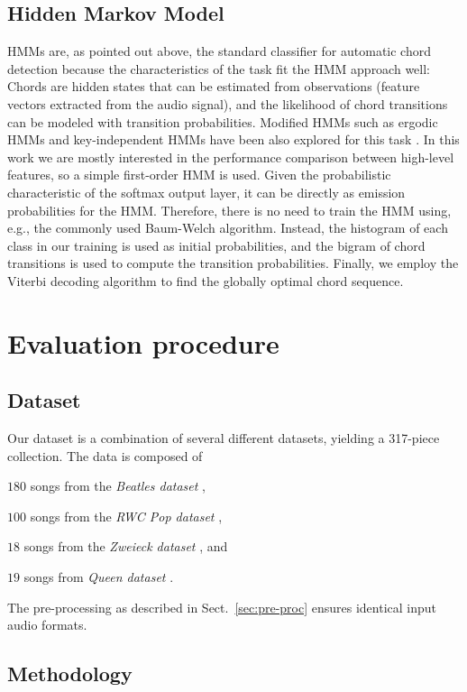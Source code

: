\documentclass{article}
\begin{document}
\subsection{Hidden Markov Model}
HMMs are, as pointed out above, the standard classifier for automatic chord detection because the characteristics of the task fit the HMM approach well: Chords are hidden states that can be estimated from observations (feature vectors extracted from the audio signal), and the likelihood of chord transitions can be modeled with transition probabilities. 
Modified HMMs such as ergodic HMMs and key-independent HMMs have been also explored for this task \cite{papadopoulos2007large,lee2008acoustic}. In this work we are mostly interested in the performance comparison between high-level features, so a simple first-order HMM is used. 
Given the probabilistic characteristic of the softmax output layer, it can be directly as emission probabilities for the HMM. Therefore, there is no need to train the HMM using, e.g., the commonly used Baum-Welch algorithm. Instead, the histogram of each class in our training is used as initial probabilities, and the bigram of chord transitions is used to compute the transition probabilities. Finally, we employ the Viterbi decoding algorithm to find the globally optimal chord sequence. 

\section{Evaluation procedure}
\subsection{Dataset}
Our dataset is a combination of several different datasets, yielding a 317-piece collection. The data is composed of 
\begin{compactitem}
	\item   $180$ songs from the \textit{Beatles dataset} \cite{mauch2009omras2},
    \item   $100$ songs from the \textit{RWC Pop dataset} \cite{goto2002rwc}, 
    \item   $18$ songs from the \textit{Zweieck dataset} \cite{mauch2009omras2}, and 
    \item   $19$ songs from \textit{Queen dataset} \cite{mauch2009omras2}.
\end{compactitem}  
The pre-processing as described in Sect.~\ref{sec:pre-proc} ensures identical input audio formats.

\subsection{Methodology}
\end{document}
